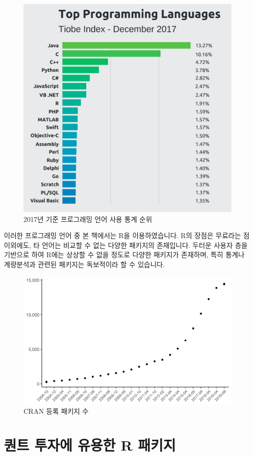 \documentclass[12pt,]{book}
\begin{document}
\begin{figure}[h]

{\centering \includegraphics[width=0.5\linewidth]{images/tiobe_index} 

}

\caption{2017년 기준 프로그래밍 언어 사용 통계 순위}\label{fig:pkg}
\end{figure}

이러한 프로그래밍 언어 중 본 책에서는 R을 이용하였습니다. R의 장점은 무료라는 점 이외에도, 타 언어는 비교할 수 없는 다양한 패키지의 존재입니다. 두터운 사용자 층을 기반으로 하여 R에는 상상할 수 없을 정도로 다양한 패키지가 존재하며, 특히 통계나 계량분석과 관련된 패키지는 독보적이라 할 수 있습니다.

\begin{figure}[h]

{\centering \includegraphics[width=0.7\linewidth]{images/cran_pkgs} 

}

\caption{CRAN 등록 패키지 수}\label{fig:tiobe}
\end{figure}

\hypertarget{r--1}{%
\section{퀀트 투자에 유용한 R 패키지}\label{r--1}}
\end{document}

